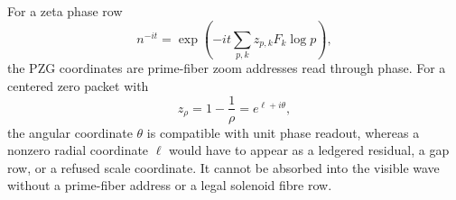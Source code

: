 \begin{principle}
\label{prin:rh-prime-fiber-zoom-rh-reading}
For a zeta phase row
$$
n^{-it}
=
\exp\left(
-it\sum_{p,k}z_{p,k}F_k\log p
\right),
$$
the PZG coordinates are prime-fiber zoom addresses read through phase.
For a centered zero packet with
$$
z_{\rho}=1-\frac1\rho=e^{\ell+i\theta},
$$
the angular coordinate $\theta$ is compatible with unit phase readout,
whereas a nonzero radial coordinate $\ell$ would have to appear as a
ledgered residual, a gap row, or a refused scale coordinate. It cannot
be absorbed into the visible wave without a prime-fiber address or a
legal solenoid fibre row.
\end{principle}
